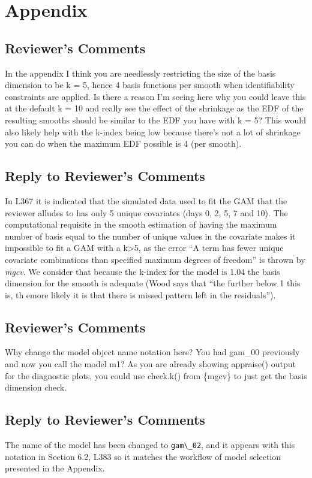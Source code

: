 \documentclass[
]{article}
\newcommand{\passthrough}[1]{#1}
\begin{document}
\hypertarget{appendix}{%
\section{Appendix}\label{appendix}}

\hypertarget{reviewers-comments-8}{%
\subsection{Reviewer's Comments}\label{reviewers-comments-8}}

In the appendix I think you are needlessly restricting the size of the basis dimension to be k = 5, hence 4 basis functions per smooth when identifiability constraints are applied. Is there a reason I'm seeing here why you could leave this at the default k = 10 and really see the effect of the shrinkage as the EDF of the resulting smooths should be similar to the EDF you have with k = 5? This would also likely help with the k-index being low because there's not a lot of shrinkage you can do when the maximum EDF possible is 4 (per smooth).

\hypertarget{section-8}{%
\subsection{\texorpdfstring{\textcolor{reviewersblue} {Reply to Reviewer's Comments}}{}}\label{section-8}}

In L367 it is indicated that the simulated data used to fit the GAM that the reviewer alludes to has only 5 unique covariates (days 0, 2, 5, 7 and 10). The computational requisite in the smooth estimation of having the maximum number of basis equal to the number of unique values in the covariate makes it impossible to fit a GAM with a k\textgreater5, as the error ``A term has fewer unique covariate combinations than specified maximum degrees of freedom'' is thrown by \emph{mgcv}. We consider that because the k-index for the model is 1.04 the basis dimension for the smooth is adequate (Wood says that ``the further below 1 this is, th emore likely it is that there is missed pattern left in the residuals'').

\hypertarget{reviewers-comments-9}{%
\subsection{Reviewer's Comments}\label{reviewers-comments-9}}

Why change the model object name notation here? You had gam\_00 previously and now you call the model m1? As you are already showing appraise() output for the diagnostic plots, you could use check.k() from \{mgcv\} to just get the basis dimension check.

\hypertarget{section-9}{%
\subsection{\texorpdfstring{\textcolor{reviewersblue} {Reply to Reviewer's Comments}}{}}\label{section-9}}

The name of the model has been changed to \passthrough{\lstinline!gam\_02!}, and it appears with this notation in Section 6.2, L383 so it matches the workflow of model selection presented in the Appendix.
\end{document}
